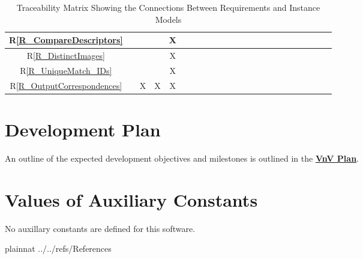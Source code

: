 \documentclass[12pt]{article}
\newcommand{\rref}[1]{R\ref{#1}}
\begin{document}
\begin{landscape}
\begin{table}[h!]
\begin{tabular}{|c|c|c|c|c|c|c|c|c|c|c|c|c|c|c|c|c|c|c|c|c|c|c|}
\rref{R_CompareDescriptors}     & & & &X& & & & & & & & & & & & & & & \\ \hline
\rref{R_DistinctImages}  & & & &X& & & & & & & & & & & & & & & \\ \hline
\rref{R_UniqueMatch_IDs}         & & & &X& & & & & & & & & & & & & & & \\ \hline
\rref{R_OutputCorrespondences}        & &X&X&X& & & & & & & & & & & & & & & \\ \hline
\hline
\end{tabular}
\caption{Traceability Matrix Showing the Connections Between Requirements and Instance Models}
\label{Table:R_trace}
\end{table}
\end{landscape}

\section{Development Plan}
An outline of the expected development objectives and milestones is outlined in the \href{https://github.com/KiranSingh15/CAS-741-Image-Correspondences/blob/main/docs/VnVPlan/VnVPlan.pdf}\textbf{VnV Plan}.

\section{Values of Auxiliary Constants}
No auxillary constants are defined for this software.

\newpage
 {plainnat}
 {../../refs/References}
\end{document}
